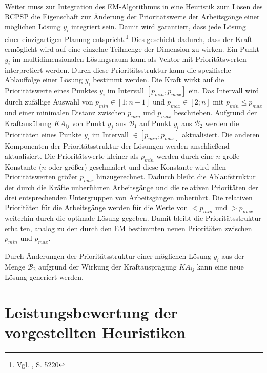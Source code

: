 \documentclass[a4paper,12pt,normalheadings,footexclude,headinclude,liststotoc,nochapterprefix,onecolumn,oneside,parskip,pointlessnumbers]{scrreprt}
\begin{document}
Weiter muss zur Integration des EM-Algorithmus in eine Heuristik zum Lösen des RCPSP die Eigenschaft zur Änderung der Prioritätswerte der Arbeitsgänge einer möglichen Lösung $y_{i}$ integriert sein. Damit wird garantiert, dass jede Lösung einer einzigartigen Planung entspricht.\footnote{Vgl. \cite{tang2012resource}, S. 5220} Dies geschieht dadurch, dass der Kraft ermöglicht wird auf eine einzelne Teilmenge der Dimension zu wirken.
Ein Punkt $y_{i}$ im multidimensionalen Lösungsraum kann als Vektor mit Prioritätswerten interpretiert werden. Durch diese Prioritätsstruktur kann die spezifische Ablauffolge einer Lösung $y_{i}$ bestimmt werden.
Die Kraft wirkt auf die Prioritätswerte eines Punktes $y_{i}$ im Intervall $[p_{min},p_{max}]$ ein. Das Intervall wird durch zufällige Auswahl von $p_{min} \in [1;n-1]$ und $p_{max} \in [2;n]$ mit $p_{min} \leq p_{max}$ und einer minimalen Distanz zwischen $p_{min}$ und $p_{max}$ beschrieben. Aufgrund der Kraftausübung $KA_{ij}$ von Punkt $y_{j}$ aus $\mathcal{B}_{1}$ auf Punkt $y_{i}$ aus $\mathcal{B}_{2}$ werden die Prioritäten eines Punkte $y_{i}$ im Intervall $\in [p_{min}, p_{max}]$ aktualisiert. %
Die anderen Komponenten der Prioritätsstruktur der Lösungen werden anschließend aktualisiert. Die Prioritätswerte kleiner als $p_{min}$ werden durch eine $n$-große Konstante ($n$ oder größer) geschmälert und diese Konstante wird allen Prioritätswerten größer $p_{max}$ hinzugerechnet. Dadurch bleibt die Ablaufstruktur der durch die Kräfte unberührten Arbeitsgänge und die relativen Prioritäten der drei entsprechenden Untergruppen von Arbeitsgängen unberührt. Die relativen Prioritäten für die Arbeitsgänge werden für die Werte von $<p_{min}$ und $>p_{max}$ weiterhin durch die optimale Lösung gegeben. Damit bleibt die Prioritätsstruktur erhalten, analog zu den durch den EM bestimmten neuen Prioritäten zwischen $p_{min}$ und $p_{max}$.

Durch Änderungen der Prioritätsstruktur einer möglichen Lösung $y_{i}$ aus der Menge $\mathcal{B}_{2}$ aufgrund der Wirkung der Kraftausprägung $KA_{ij}$ kann eine neue Lösung generiert werden.




\chapter{Leistungsbewertung der vorgestellten Heuristiken} \label{rechnung}
\end{document}
